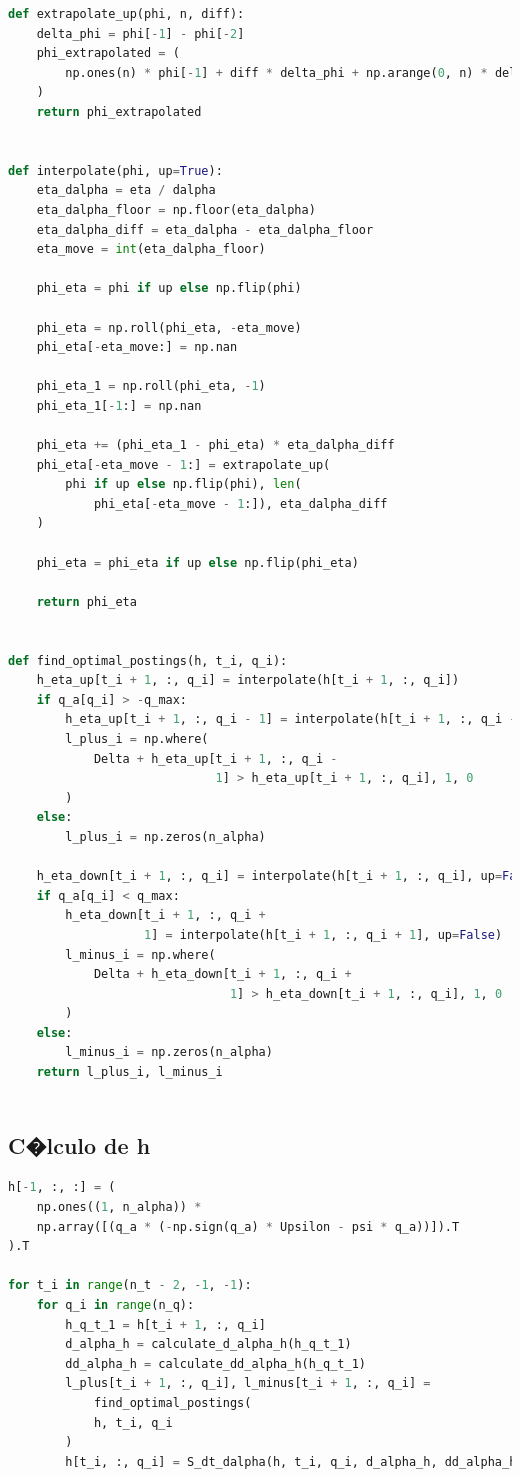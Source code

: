 \documentclass[12pt,a4paper,spanish]{article}%
\begin{document}
\begin{appendices}
\begin{lstlisting}[language=Python]
def extrapolate_up(phi, n, diff):
    delta_phi = phi[-1] - phi[-2]
    phi_extrapolated = (
        np.ones(n) * phi[-1] + diff * delta_phi + np.arange(0, n) * delta_phi
    )
    return phi_extrapolated


def interpolate(phi, up=True):
    eta_dalpha = eta / dalpha
    eta_dalpha_floor = np.floor(eta_dalpha)
    eta_dalpha_diff = eta_dalpha - eta_dalpha_floor
    eta_move = int(eta_dalpha_floor)

    phi_eta = phi if up else np.flip(phi)

    phi_eta = np.roll(phi_eta, -eta_move)
    phi_eta[-eta_move:] = np.nan

    phi_eta_1 = np.roll(phi_eta, -1)
    phi_eta_1[-1:] = np.nan

    phi_eta += (phi_eta_1 - phi_eta) * eta_dalpha_diff
    phi_eta[-eta_move - 1:] = extrapolate_up(
        phi if up else np.flip(phi), len(
            phi_eta[-eta_move - 1:]), eta_dalpha_diff
    )

    phi_eta = phi_eta if up else np.flip(phi_eta)

    return phi_eta


def find_optimal_postings(h, t_i, q_i):
    h_eta_up[t_i + 1, :, q_i] = interpolate(h[t_i + 1, :, q_i])
    if q_a[q_i] > -q_max:
        h_eta_up[t_i + 1, :, q_i - 1] = interpolate(h[t_i + 1, :, q_i - 1])
        l_plus_i = np.where(
            Delta + h_eta_up[t_i + 1, :, q_i -
                             1] > h_eta_up[t_i + 1, :, q_i], 1, 0
        )
    else:
        l_plus_i = np.zeros(n_alpha)

    h_eta_down[t_i + 1, :, q_i] = interpolate(h[t_i + 1, :, q_i], up=False)
    if q_a[q_i] < q_max:
        h_eta_down[t_i + 1, :, q_i +
                   1] = interpolate(h[t_i + 1, :, q_i + 1], up=False)
        l_minus_i = np.where(
            Delta + h_eta_down[t_i + 1, :, q_i +
                               1] > h_eta_down[t_i + 1, :, q_i], 1, 0
        )
    else:
        l_minus_i = np.zeros(n_alpha)
    return l_plus_i, l_minus_i
   
\end{lstlisting}
\subsection{C�lculo de h}
\begin{lstlisting}[language=Python]
h[-1, :, :] = (
    np.ones((1, n_alpha)) *
    np.array([(q_a * (-np.sign(q_a) * Upsilon - psi * q_a))]).T
).T

for t_i in range(n_t - 2, -1, -1):
    for q_i in range(n_q):
        h_q_t_1 = h[t_i + 1, :, q_i]
        d_alpha_h = calculate_d_alpha_h(h_q_t_1)
        dd_alpha_h = calculate_dd_alpha_h(h_q_t_1)
        l_plus[t_i + 1, :, q_i], l_minus[t_i + 1, :, q_i] = 
        	find_optimal_postings(
            h, t_i, q_i
        )
        h[t_i, :, q_i] = S_dt_dalpha(h, t_i, q_i, d_alpha_h, dd_alpha_h)
\end{lstlisting}

\end{appendices}
\end{document}
